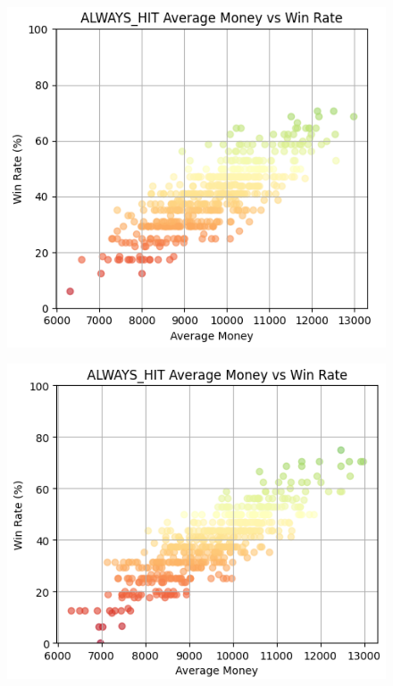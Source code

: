 \documentclass[a4paper,12pt]{report}
\begin{document}
\begin{figure}[h]
    \begin{minipage}{0.45\textwidth}
        \centering
        \includegraphics[scale=0.4]{figures/graphs/16.png}
        \label{fig:16}
    \end{minipage}
    \begin{minipage}{0.45\textwidth}
        \includegraphics[scale=0.43]{figures/graphs/17.png}
        \label{fig:17}
    \end{minipage}
    \label{fig:16_17}
\end{figure}
\end{document}
